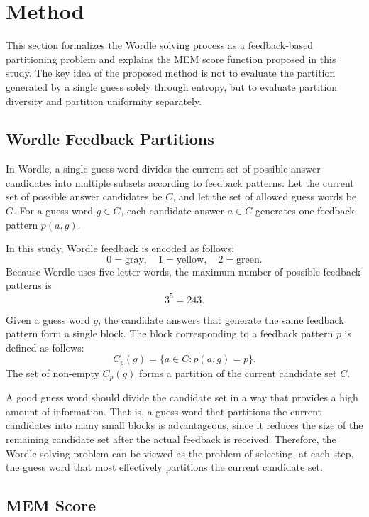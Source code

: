 \documentclass[11pt]{article}
\begin{document}
\section{Method}
\label{sec:method}


This section formalizes the Wordle solving process as a feedback-based partitioning problem and explains the MEM score function proposed in this study.
The key idea of the proposed method is not to evaluate the partition generated by a single guess solely through entropy, but to evaluate partition diversity and partition uniformity separately.

\subsection{Wordle Feedback Partitions}

In Wordle, a single guess word divides the current set of possible answer candidates into multiple subsets according to feedback patterns.
Let the current set of possible answer candidates be $C$, and let the set of allowed guess words be $G$.
For a guess word $g \in G$, each candidate answer $a \in C$ generates one feedback pattern $p(a,g)$.

In this study, Wordle feedback is encoded as follows:
\[
0 = \text{gray}, \quad
1 = \text{yellow}, \quad
2 = \text{green}.
\]
Because Wordle uses five-letter words, the maximum number of possible feedback patterns is
\[
3^5 = 243.
\]

Given a guess word $g$, the candidate answers that generate the same feedback pattern form a single block.
The block corresponding to a feedback pattern $p$ is defined as follows:
\[
C_p(g) = \{ a \in C : p(a,g) = p \}.
\]
The set of non-empty $C_p(g)$ forms a partition of the current candidate set $C$.

A good guess word should divide the candidate set in a way that provides a high amount of information.
That is, a guess word that partitions the current candidates into many small blocks is advantageous, since it reduces the size of the remaining candidate set after the actual feedback is received.
Therefore, the Wordle solving problem can be viewed as the problem of selecting, at each step, the guess word that most effectively partitions the current candidate set.

\subsection{MEM Score}
\end{document}
